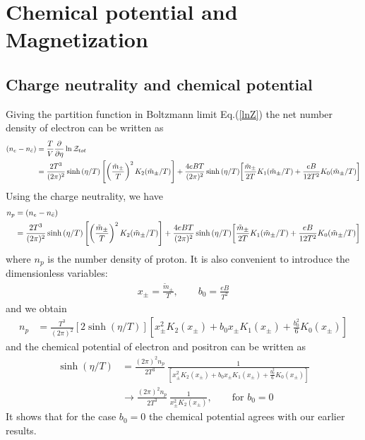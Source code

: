 \documentclass[Universe,article,submit,moreauthors,pdftex]{Definitions/mdpi}
\begin{document}
\section{Chemical potential and Magnetization}


\subsection{Charge neutrality and chemical potential}
Giving the partition function in Boltzmann limit Eq.(\ref{lnZ}) the net number density of electron can be written as
\begin{align}
\left(n_e-n_{\bar e}\right)&=\frac{T}{V}\frac{\partial}{\partial \eta}\ln\mathcal{Z}_{tot}\notag\\
&=\frac{2T^3}{(2\pi)^2}\sinh{(\eta/T)}\left[\left(\frac{\tilde{m}_\pm}{T}\right)^2K_2(\tilde m_\pm/T)\right]+\frac{4eBT}{(2\pi)^2}\sinh{(\eta/T)}\bigg[\frac{\tilde{m}_\pm}{2T}K_1(\tilde m_\pm/T)+\frac{eB}{12T^2}K_0(\tilde m_\pm/T)\bigg]
\end{align}
Using the charge neutrality, we have
\begin{align}
n_p&=\left(n_e-n_{\bar e}\right)\notag\\
&=\frac{2T^3}{(2\pi)^2}\sinh{(\eta/T)}\left[\left(\frac{\tilde{m}_\pm}{T}\right)^2K_2(\tilde m_\pm/T)\right]
+\frac{4eBT}{(2\pi)^2}\sinh{(\eta/T)}\bigg[\frac{\tilde{m}_\pm}{2T}K_1(\tilde m_\pm/T)+\frac{eB}{12T^2}K_0(\tilde m_\pm/T)\bigg]
\end{align}
where $n_p$ is the number density of proton. It is also convenient to introduce the dimensionless variables:
\begin{align}
x_\pm=\frac{\tilde m_\pm}{T},\qquad b_0=\frac{eB}{T^2}
\end{align}
and we obtain
\begin{align}
n_p&=\frac{T^3}{(2\pi)^2}\left[2\sinh{(\eta/T)}\right]\left[x_\pm^2K_2(x_\pm)+b_0x_\pm K_1(x_\pm)+\frac{b^2_0}{6}K_0(x_\pm)\right]
\end{align}
and the chemical potential of electron and positron can be written as
\begin{align}\label{ChemicalPotential}
\sinh{(\eta/T)}&=\frac{(2\pi)^2n_p}{2T^3}\,\frac{1}{\left[x_\pm^2K_2(x_\pm)+b_0x_\pm K_1(x_\pm)+\frac{b^2_0}{6}K_0(x_\pm)\right]}\\
&\longrightarrow\frac{(2\pi)^2n_p}{2T^3}\,\frac{1}{x_\pm^2K_2(x_\pm)},\qquad \mathrm{for}\,\,b_0=0
\end{align}
It shows that for the case $b_0=0$ the chemical potential agrees with our earlier results.
\end{document}
